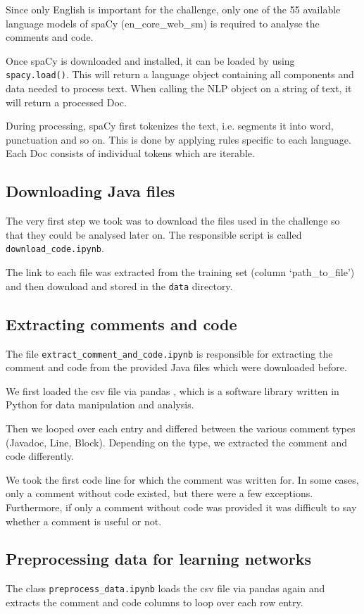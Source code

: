 \documentclass[runningheads]{llncs}
\begin{document}
Since only English is important for the challenge, only one of the 55 available language models of spaCy (en\_core\_web\_sm) is required to analyse the comments and code.

Once spaCy is downloaded and installed, it can be loaded by using \texttt{spacy.load()}. This will return a language object containing all components and data needed to process text.
When calling the NLP object on a string of text, it will return a processed Doc.

During processing, spaCy first tokenizes the text, i.e. segments it into word, punctuation and so on. This is done by applying rules specific to each language. Each Doc consists of individual tokens which are iterable.

\subsection{Downloading Java files}
The very first step we took was to download the files used in the challenge so that they could be analysed later on. The responsible script is called \texttt{download\_code.ipynb}.

The link to each file was extracted from the training set (column `path\_to\_file') and then download and stored in the \texttt{data} directory.

\subsection{Extracting comments and code}
The file \texttt{extract\_comment\_and\_code.ipynb} is responsible for extracting the comment and code from the provided Java files which were downloaded before.

We first loaded the csv file via pandas \cite{ref_pandas}, which is a software library written in Python for data manipulation and analysis.

Then we looped over each entry and differed between the various comment types (Javadoc, Line, Block). Depending on the type, we extracted the comment and code differently.

We took the first code line for which the comment was written for. In some cases, only a comment without code existed, but there were a few exceptions. Furthermore, if only a comment without code was provided it was difficult to say whether a comment is useful or not.

\newpage
\subsection{Preprocessing data for learning networks}
The class \texttt{preprocess\_data.ipynb} loads the csv file via pandas again and extracts the comment and code columns to loop over each row entry.
\end{document}
